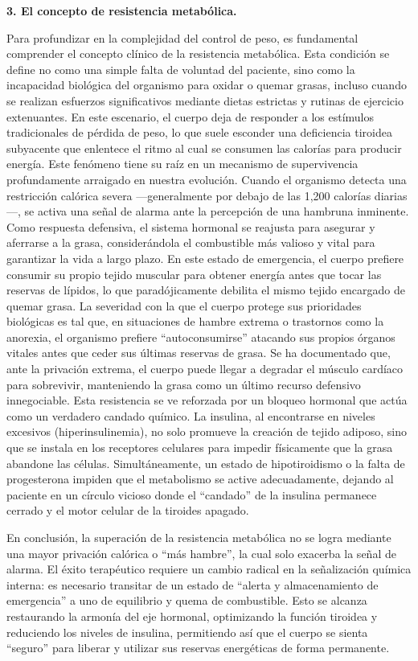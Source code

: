 \documentclass[
  spanish,
]{article}
\begin{document}
\textbf{3. El concepto de resistencia metabólica.}

Para profundizar en la complejidad del control de peso, es fundamental comprender el concepto clínico de la resistencia metabólica. Esta condición se define no como una simple falta de voluntad del paciente, sino como la incapacidad biológica del organismo para oxidar o quemar grasas, incluso cuando se realizan esfuerzos significativos mediante dietas estrictas y rutinas de ejercicio extenuantes. En este escenario, el cuerpo deja de responder a los estímulos tradicionales de pérdida de peso, lo que suele esconder una deficiencia tiroidea subyacente que enlentece el ritmo al cual se consumen las calorías para producir energía.
Este fenómeno tiene su raíz en un mecanismo de supervivencia profundamente arraigado en nuestra evolución. Cuando el organismo detecta una restricción calórica severa ---generalmente por debajo de las 1,200 calorías diarias---, se activa una señal de alarma ante la percepción de una hambruna inminente. Como respuesta defensiva, el sistema hormonal se reajusta para asegurar y aferrarse a la grasa, considerándola el combustible más valioso y vital para garantizar la vida a largo plazo. En este estado de emergencia, el cuerpo prefiere consumir su propio tejido muscular para obtener energía antes que tocar las reservas de lípidos, lo que paradójicamente debilita el mismo tejido encargado de quemar grasa.
La severidad con la que el cuerpo protege sus prioridades biológicas es tal que, en situaciones de hambre extrema o trastornos como la anorexia, el organismo prefiere ``autoconsumirse'' atacando sus propios órganos vitales antes que ceder sus últimas reservas de grasa. Se ha documentado que, ante la privación extrema, el cuerpo puede llegar a degradar el músculo cardíaco para sobrevivir, manteniendo la grasa como un último recurso defensivo innegociable.
Esta resistencia se ve reforzada por un bloqueo hormonal que actúa como un verdadero candado químico. La insulina, al encontrarse en niveles excesivos (hiperinsulinemia), no solo promueve la creación de tejido adiposo, sino que se instala en los receptores celulares para impedir físicamente que la grasa abandone las células. Simultáneamente, un estado de hipotiroidismo o la falta de progesterona impiden que el metabolismo se active adecuadamente, dejando al paciente en un círculo vicioso donde el ``candado'' de la insulina permanece cerrado y el motor celular de la tiroides apagado.

En conclusión, la superación de la resistencia metabólica no se logra mediante una mayor privación calórica o ``más hambre'', la cual solo exacerba la señal de alarma. El éxito terapéutico requiere un cambio radical en la señalización química interna: es necesario transitar de un estado de ``alerta y almacenamiento de emergencia'' a uno de equilibrio y quema de combustible. Esto se alcanza restaurando la armonía del eje hormonal, optimizando la función tiroidea y reduciendo los niveles de insulina, permitiendo así que el cuerpo se sienta ``seguro'' para liberar y utilizar sus reservas energéticas de forma permanente.
\end{document}

